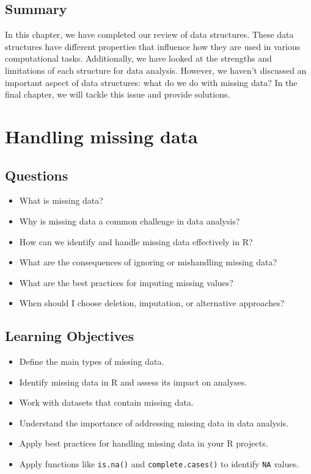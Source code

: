 \documentclass[
  letterpaper,
  DIV=11,
  numbers=noendperiod]{scrreprt}
\begin{document}
\section{Summary}\label{summary-10}

In this chapter, we have completed our review of data structures. These
data structures have different properties that influence how they are
used in various computational tasks. Additionally, we have looked at the
strengths and limitations of each structure for data analysis. However,
we haven't discussed an important aspect of data structures: what do we
do with missing data? In the final chapter, we will tackle this issue
and provide solutions.


\chapter{Handling missing data}\label{sec-missing}

\section{Questions}\label{questions-11}

\begin{itemize}
\item
  What is missing data?
\item
  Why is missing data a common challenge in data analysis?
\item
  How can we identify and handle missing data effectively in R?
\item
  What are the consequences of ignoring or mishandling missing data?
\item
  What are the best practices for imputing missing values?
\item
  When should I choose deletion, imputation, or alternative approaches?
\end{itemize}

\section{Learning Objectives}\label{learning-objectives-11}

\begin{itemize}
\item
  Define the main types of missing data.
\item
  Identify missing data in R and assess its impact on analyses.
\item
  Work with datasets that contain missing data.
\item
  Understand the importance of addressing missing data in data analysis.
\item
  Apply best practices for handling missing data in your R projects.
\item
  Apply functions like \texttt{is.na()} and \texttt{complete.cases()} to
  identify \texttt{NA} values.
\end{itemize}
\end{document}
